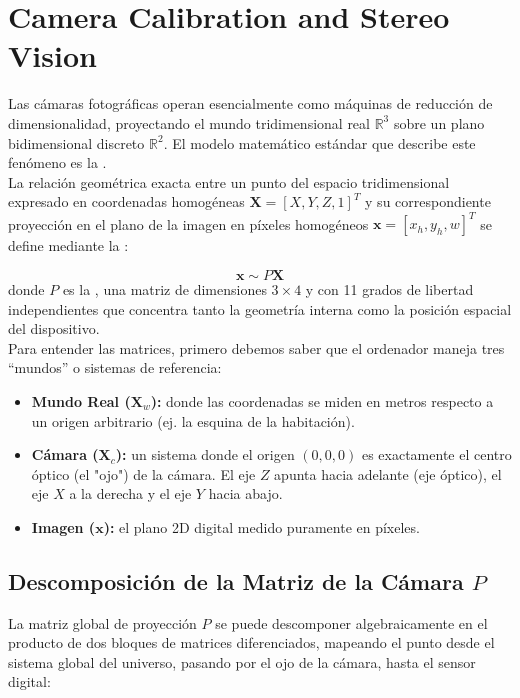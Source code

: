 \chapter{Camera Calibration and Stereo Vision}
\noindent
Las cámaras fotográficas operan esencialmente como máquinas de reducción de dimensionalidad, proyectando el mundo tridimensional real $\mathbb{R}^3$ sobre un plano bidimensional discreto $\mathbb{R}^2$. El modelo matemático estándar que describe este fenómeno es la . \\

\noindent
La relación geométrica exacta entre un punto del espacio tridimensional expresado en coordenadas homogéneas $\mathbf{X} = [X, Y, Z, 1]^T$ y su correspondiente proyección en el plano de la imagen en píxeles homogéneos $\mathbf{x} = [x_h, y_h, w]^T$ se define mediante la :

$$\mathbf{x} \sim P\mathbf{X}$$
donde $P$ es la , una matriz de dimensiones $3 \times 4$ y con 11 grados de libertad independientes que concentra tanto la geometría interna como la posición espacial del dispositivo. \\

\noindent
Para entender las matrices, primero debemos saber que el ordenador maneja tres ``mundos'' o sistemas de referencia:
\begin{itemize}
    \item \textbf{Mundo Real ($\mathbf{X}_w$):} donde las coordenadas se miden en metros respecto a un origen arbitrario (ej. la esquina de la habitación).
    \item \textbf{Cámara ($\mathbf{X}_c$):} un sistema donde el origen $(0,0,0)$ es exactamente el centro óptico (el "ojo") de la cámara. El eje $Z$ apunta hacia adelante (eje óptico), el eje $X$ a la derecha y el eje $Y$ hacia abajo.
    \item \textbf{Imagen ($\mathbf{x}$):} el plano 2D digital medido puramente en píxeles.
\end{itemize}

\section{Descomposición de la Matriz de la Cámara $P$}
La matriz global de proyección $P$ se puede descomponer algebraicamente en el producto de dos bloques de matrices diferenciados, mapeando el punto desde el sistema global del universo, pasando por el ojo de la cámara, hasta el sensor digital:

